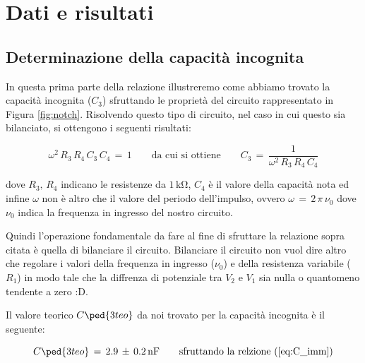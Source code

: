 \section*{Dati e risultati}

\subsection*{Determinazione della capacità incognita}

In questa prima parte della relazione illustreremo come abbiamo trovato la capacità incognita ($C_3$) sfruttando le proprietà del circuito rappresentato in Figura \ref{fig:notch}.
Risolvendo questo tipo di circuito, nel caso in cui questo sia bilanciato, si ottengono i seguenti risultati:

\begin{equation}
	\omega^2\,R_3\,R_4\,C_3\,C_4 \,=\, 1 \qquad \text{da cui si ottiene} \qquad C_3 \,=\, \frac{1}{\omega^2\,R_3\,R_4\,C_4}
	\label{eq:C_imm}
\end{equation}

dove $R_3,\,R_4$ indicano le resistenze da $1\,\si{\kilo\ohm}$, $C_4$ è il valore della capacità nota ed infine $\omega$ non è altro che il valore del periodo dell'impulso, ovvero $\omega \,=\, 2\,\pi\,\nu_0$ dove $\nu_0$ indica la frequenza in ingresso del nostro circuito.

Quindi l'operazione fondamentale da fare al fine di sfruttare la relazione sopra citata è quella di bilanciare il circuito. Bilanciare il circuito non vuol dire altro che regolare i valori della frequenza in ingresso ($\nu_0$) e della resistenza variabile ($R_1$) in modo tale che la diffrenza di potenziale tra $V_2$ e $V_1$ sia nulla o quantomeno tendente a zero :D.

Il valore teorico $C\ped{3teo}$ da noi trovato per la capacità incognita è il seguente:

\begin{equation}
	C\ped{3teo} \,=\, 2.9 \,\pm\, 0.2 \,\si{\nano\farad}  \qquad \text{sfruttando la relzione (\ref{eq:C_imm})}
	\label{eq:C_teo_imm}
\end{equation}

